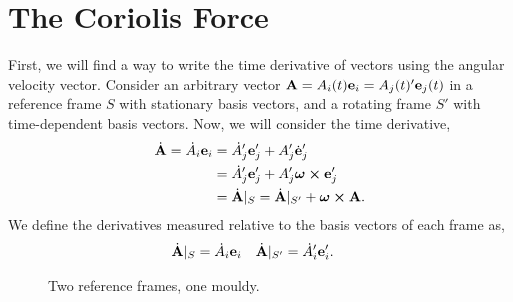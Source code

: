 \documentclass{book}
\begin{document}
\section{The Coriolis Force}
First, we will find a way to write the time derivative of vectors using the angular velocity vector. Consider an arbitrary vector $\vb{A} = A_i(t)\vb{e}_i = A_j(t)'\vb{e}_j(t)$ in a reference frame $S$ with stationary basis vectors, and a rotating frame $S'$ with time-dependent basis vectors. Now, we will consider the time derivative,
\begin{equation*}
    \begin{split}
        \Dot{\vb{A}} = \Dot{A}_i\vb{e}_i & = \Dot{A}_j'\vb{e}_j'+A_j'\Dot{\vb{e}}_j' \\
         &= \Dot{A}'_j\vb{e}_j' + A_j'\vb*{\omega}\cross \vb{e}_j'  \\
         &= \Dot{\vb{A}}|_S = \Dot{\vb{A}}|_{S'} + \vb*{\omega} \cross \vb{A}.
    \end{split}
\end{equation*}
We define the derivatives measured relative to the basis vectors of each frame as,
\begin{align}
    \Dot{\vb{A}}|_S&=\Dot{A}_i\vb{e}_i & \Dot{\vb{A}}|_{S'} &= \Dot{A}_i'\vb{e}_i'.
\end{align}
\begin{figure}

    \centering
    \begin{subfigure}{0.4\textwidth}
    \end{subfigure}
    \begin{subfigure}{0.4\textwidth}
    \end{subfigure}
    \caption{Two reference frames, one mouldy.}
    \label{fig:rotating}
\end{figure}
\end{document}
